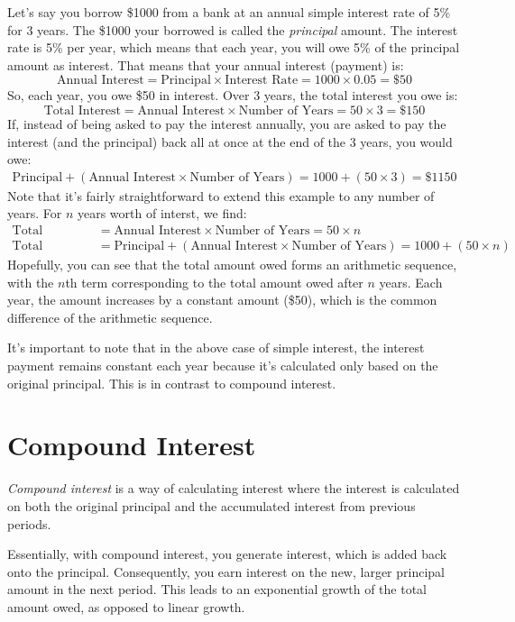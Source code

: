 \begin{eg}
	Let's say you borrow \$1000 from a bank at an annual simple interest rate of 5\% for 3 years. 
	The \$1000 your borrowed is called the \textit{principal} amount. The interest rate is 5\% per year, which means that
	each year, you will owe 5\% of the principal amount as interest. That means that your annual interest (payment) is:
	\begin{equation*}
		\text{Annual Interest} = \text{Principal} \times \text{Interest Rate} = 1000 \times 0.05 = \$50
	\end{equation*}
	So, each year, you owe \$50 in interest. Over 3 years, the total interest you owe is:
	\begin{equation*}
		\text{Total Interest} = \text{Annual Interest} \times \text{Number of Years} = 50 \times 3 = \$150
	\end{equation*}
	If, instead of being asked to pay the interest annually, you are asked to pay the interest (and the principal) back 
	all at once at the end of the 3 years, you would owe:
	\begin{align*}
		\text{Principal} + (\text{Annual Interest} \times \text{Number of Years}) &= 1000 + (50 \times 3) = \$1150
	\end{align*}
	Note that it's fairly straightforward to extend this example to any number of years. For $n$ years worth of interst, we find:
	\begin{align*}
		\text{Total Interest} &= \text{Annual Interest} \times \text{Number of Years} = 50 \times n \\
		\text{Total Amount Owed} &= \text{Principal} + (\text{Annual Interest} \times \text{Number of Years}) = 1000 + (50 \times n)
	\end{align*}
	Hopefully, you can see that the total amount owed forms an arithmetic sequence, with the $n$th term corresponding to the total amount owed
	after $n$ years. Each year, the amount increases by a constant amount (\$50), which is the common difference of the arithmetic sequence.
\end{eg}

It's important to note that in the above case of simple interest, the interest payment remains
constant each year because it's calculated only based on the original principal. This is in contrast to compound interest. 

\section{Compound Interest}

\begin{definition}
	  \textit{Compound interest} is a way of calculating interest where the interest is calculated on both the original principal
  and the accumulated interest from previous periods.
\end{definition}

Essentially, with compound interest, you generate interest, which is added back onto the principal. 
Consequently, you earn interest on the new, larger principal amount in the next period. 
This leads to an exponential growth of the total amount owed, as opposed to linear growth. 